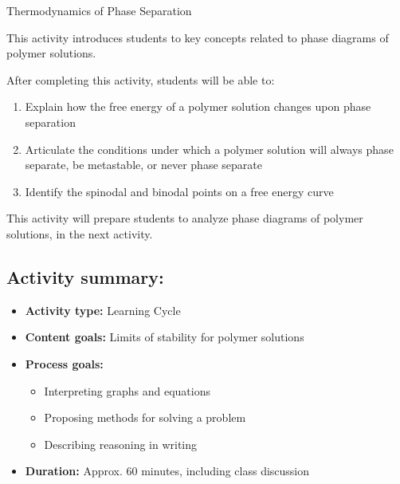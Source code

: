 %
%
%
%

\renewcommand{\figpath}{content/polymphys/solution-thermo/phase-sep/figs}
\renewcommand{\labelbase}{phase-sep}

\begin{activity}{Thermodynamics of Phase Separation}

\begin{instructornotes}

	This activity introduces students to key concepts related to phase diagrams of polymer solutions.
	
	After completing this activity, students will be able to:
			\begin{enumerate}
				\item Explain how the free energy of a polymer solution changes upon phase separation
				\item Articulate the conditions under which a polymer solution will always phase separate, be metastable, or never phase separate
				\item Identify the spinodal and binodal points on a free energy curve
			\end{enumerate}
			
	This activity will prepare students to analyze phase diagrams of polymer solutions, in the next activity.
			
	\subsection*{Activity summary:}
	\begin{itemize}
		\item \textbf{Activity type:} Learning Cycle
		\item \textbf{Content goals:} Limits of stability for polymer solutions
		\item \textbf{Process goals:} %
			\begin{itemize}
				\item Interpreting graphs and equations
				\item Proposing methods for solving a problem
				\item Describing reasoning in writing
			\end{itemize}
		\item \textbf{Duration:} Approx. 60 minutes, including class discussion
		

\end{itemize}
\end{instructornotes}
\end{activity}
